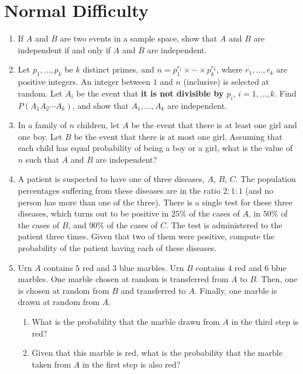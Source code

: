 \documentclass[svgnames]{amsart}
\begin{document}
\section{Normal Difficulty}
\begin{enumerate}
\item If $A$ and $B$ are two events in a sample space, show that $A$ and $B$ are independent if and only if $A$ and $\overline B$ are independent.

\item Let $p_1, \ldots, p_k$ be $k$ distinct primes, and $n = p_1^{r_1} \times \cdots \times p_k^{r_k}$, where $r_1, \ldots, r_k$ are positive integers. An integer between $1$ and $n$ (inclusive) is selected at random. Let $A_i$ be the event that \textbf{it is not divisible by $p_i$}, $i = 1, \ldots, k$. Find $P(A_1 A_2 \cdots A_k)$, and show that $A_1, \ldots, A_k$ are independent.

\item In a family of $n$ children, let $A$ be the event that there is at least one girl and one boy. Let $B$ be the event that there is at most one girl. Assuming that each child has equal probability of being a boy or a girl, what is the value of $n$ such that $A$ and $B$ are independent?

\item A patient is suspected to have one of three diseases, $A$, $B$, $C$. The population percentages suffering from these diseases are in the ratio $2:1:1$ (and no person has more than one of the three). There is a single test for these three diseases, which turns out to be positive in $25\%$ of the cases of $A$, in $50\%$ of the cases of $B$, and $90\%$ of the cases of $C$. The test is administered to the patient three times. Given that two of them were positive, compute the probability of the patient having each of these diseases.

\item Urn $A$ contains $5$ red and $3$ blue marbles. Urn $B$ contains $4$ red and $6$ blue marbles. One marble chosen at random is transferred from $A$ to $B$. Then, one is chosen at random from $B$ and transferred to $A$. Finally, one marble is drawn at random from $A$.
\begin{enumerate}
	\item What is the probability that the marble drawn from $A$ in the third step is red?
	\item Given that this marble is red, what is the probability that the marble taken from $A$ in the first step is also red?
\end{enumerate}
\end{enumerate} %
\end{document}
